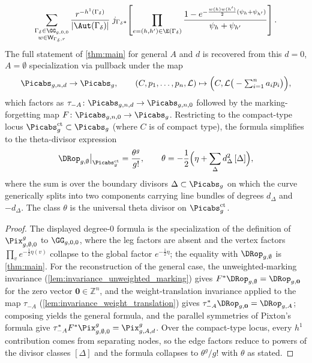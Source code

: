 \begin{theorem}
\[    \sum_{\substack{\Gamma_\delta \in \GG_{g,0,0} \\ w \in \mathsf{W}_{\Gamma_\delta,r}}}
    \frac{r^{-h^1(\Gamma_\delta)}}{|\Aut(\Gamma_\delta)|}
    \; j_{\Gamma_\delta*}\!\left[
      \prod_{e=(h,h') \in \E(\Gamma_\delta)}
        \frac{1 - e^{-\frac{w(h)w(h')}{2}(\psi_h + \psi_{h'})}}{\psi_h + \psi_{h'}}
    \right].
  \]
  The full statement of \cref{thm:main} for general $A$ and $d$ is recovered from this
  $d = 0$, $A = \emptyset$ specialization via pullback under the map
  \[
    \Picabs_{g,n,d} \to \Picabs_g, \qquad
    (C, p_1,\ldots,p_n, \mathcal{L}) \mapsto \Big(C, \mathcal{L}\big(-\textstyle\sum_{i=1}^n a_i p_i\big)\Big),
  \]
  which factors as $\tau_{-A}\colon \Picabs_{g,n,d} \to \Picabs_{g,n,0}$ followed by the
  marking-forgetting map $F\colon \Picabs_{g,n,0} \to \Picabs_g$.
  Restricting to the compact-type locus
  $\Picabs_g^{\mathrm{ct}} \subset \Picabs_g$ (where $C$ is of compact type), the formula
  simplifies to the theta-divisor expression
  \[
    \DRop_{g,\emptyset}\big|_{\Picabs_g^{\mathrm{ct}}} = \frac{\theta^g}{g!},
    \qquad
    \theta = -\frac{1}{2}\Big(\eta + \sum_{\Delta} d_\Delta^2\, [\Delta]\Big),
  \]
  where the sum is over the boundary divisors $\Delta \subset \Picabs_g$ on which the curve
  generically splits into two components carrying line bundles of degrees $d_\Delta$ and
  $-d_\Delta$.  The class $\theta$ is the universal theta divisor on
  $\Picabs_g^{\mathrm{ct}}$.
\end{theorem}

\begin{proof}
  The displayed degree-$0$ formula is the specialization of the definition of
  $\Pix^g_{g,\emptyset,0}$ to $\GG_{g,0,0}$, where the leg factors are absent and the vertex
  factors $\prod_v e^{-\frac{1}{2}\eta(v)}$ collapse to the global factor $e^{-\frac{1}{2}\eta}$;
  the equality with $\DRop_{g,\emptyset}$ is \cref{thm:main}.  For the reconstruction of the
  general case, the unweighted-marking invariance (\cref{lem:invariance_unweighted_marking})
  gives $F^*\DRop_{g,\emptyset} = \DRop_{g,\mathbf{0}}$ for the zero vector
  $\mathbf{0} \in \mathbb{Z}^n$, and the weight-translation invariance applied to the
  map $\tau_{-A}$ (\cref{lem:invariance_weight_translation}) gives
  $\tau_{-A}^*\DRop_{g,\mathbf{0}} = \DRop_{g,A}$; composing yields the general formula, and
  the parallel symmetries of Pixton's formula give $\tau_{-A}^*F^*\Pix^g_{g,\emptyset,0} =
  \Pix^g_{g,A,d}$.  Over the compact-type locus, every $h^1$ contribution comes from
  separating nodes, so the edge factors reduce to powers of the divisor classes $[\Delta]$
  and the formula collapses to $\theta^g/g!$ with $\theta$ as stated.
\end{proof}
